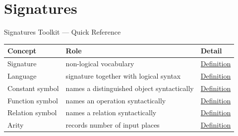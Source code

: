 \section{Signatures}

\begin{toolkitbox}{Signatures Toolkit --- Quick Reference}
\small
\begin{tabular}{l l l}
\toprule
\textbf{Concept} & \textbf{Role} & \textbf{Detail} \\
\midrule
Signature & non-logical vocabulary & \hyperref[def:signature]{Definition} \\
Language & signature together with logical syntax & \hyperref[def:language]{Definition} \\
Constant symbol & names a distinguished object syntactically & \hyperref[def:signature-constant-symbol]{Definition} \\
Function symbol & names an operation syntactically & \hyperref[def:signature-function-symbol]{Definition} \\
Relation symbol & names a relation syntactically & \hyperref[def:relation-symbol]{Definition} \\
Arity & records number of input places & \hyperref[def:arity]{Definition} \\
\bottomrule
\end{tabular}
\end{toolkitbox}


